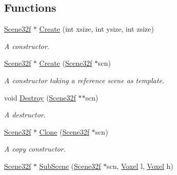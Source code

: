 \subsection*{Functions}
\begin{DoxyCompactItemize}
\item 
\hyperlink{namespacegft_1_1Scene32f_af233a2e92a79c7b46da9b3f38677644a}{Scene32f} $\ast$ \hyperlink{namespacegft_1_1Scene32f_a84045042d10f9a6f5c2110abe92b34c4}{Create} (int xsize, int ysize, int zsize)
\begin{DoxyCompactList}\small\item\em A constructor. \end{DoxyCompactList}\item 
\hyperlink{namespacegft_1_1Scene32f_af233a2e92a79c7b46da9b3f38677644a}{Scene32f} $\ast$ \hyperlink{namespacegft_1_1Scene32f_a0f3f31e35e28779202acc433b5e3e1c1}{Create} (\hyperlink{namespacegft_1_1Scene32f_af233a2e92a79c7b46da9b3f38677644a}{Scene32f} $\ast$scn)
\begin{DoxyCompactList}\small\item\em A constructor taking a reference scene as template. \end{DoxyCompactList}\item 
void \hyperlink{namespacegft_1_1Scene32f_a5b98240de0a762bb0f2b98fe1aef8670}{Destroy} (\hyperlink{namespacegft_1_1Scene32f_af233a2e92a79c7b46da9b3f38677644a}{Scene32f} $\ast$$\ast$scn)
\begin{DoxyCompactList}\small\item\em A destructor. \end{DoxyCompactList}\item 
\hyperlink{namespacegft_1_1Scene32f_af233a2e92a79c7b46da9b3f38677644a}{Scene32f} $\ast$ \hyperlink{namespacegft_1_1Scene32f_a8606baa9f4c55a0c424e31d7ca17e791}{Clone} (\hyperlink{namespacegft_1_1Scene32f_af233a2e92a79c7b46da9b3f38677644a}{Scene32f} $\ast$scn)
\begin{DoxyCompactList}\small\item\em A copy constructor. \end{DoxyCompactList}\item 
\hyperlink{namespacegft_1_1Scene32f_af233a2e92a79c7b46da9b3f38677644a}{Scene32f} $\ast$ \hyperlink{namespacegft_1_1Scene32f_a09df14c9cf4113a4efe3016fe2244787}{Sub\-Scene} (\hyperlink{namespacegft_1_1Scene32f_af233a2e92a79c7b46da9b3f38677644a}{Scene32f} $\ast$scn, \hyperlink{namespacegft_a16db894075bb714f877a3c5733772db6}{Voxel} l, \hyperlink{namespacegft_a16db894075bb714f877a3c5733772db6}{Voxel} h)
$$
\end{DoxyCompactItemize}
